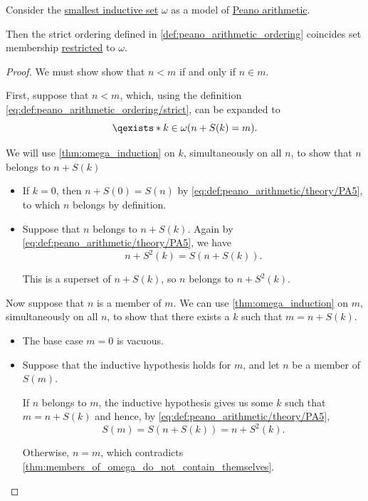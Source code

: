 \begin{proposition}\label{thm:omega_natural_numbers_order}
  Consider the \hyperref[def:smallest_inductive_set]{smallest inductive set} \( \omega \) as a model of \hyperref[def:peano_arithmetic]{Peano arithmetic}.

  Then the strict ordering defined in \cref{def:peano_arithmetic_ordering} coincides set membership \hyperref[def:relation/restriction]{restricted} to \( \omega \).
\end{proposition}
\begin{proof}
  We must show show that \( n < m \) if and only if \( n \in m \).

  \SufficiencySubProof First, suppose that \( n < m \), which, using the definition \eqref{eq:def:peano_arithmetic_ordering/strict}, can be expanded to
  \begin{equation}\label{eq:thm:omega_natural_numbers_order/proof/order_definition}
    \qexists* {k \in \omega} (n + S(k) = m).
  \end{equation}

  We will use \cref{thm:omega_induction} on \( k \), simultaneously on all \( n \), to show that \( n \) belongs to \( n + S(k) \)
  \begin{itemize}
    \item If \( k = 0 \), then \( n + S(0) = S(n) \) by \eqref{eq:def:peano_arithmetic/theory/PA5}, to which \( n \) belongs by definition.

    \item Suppose that \( n \) belongs to \( n + S(k) \). Again by \eqref{eq:def:peano_arithmetic/theory/PA5}, we have
    \begin{equation*}
      n + S^2(k) = S(n + S(k)).
    \end{equation*}

    This is a superset of \( n + S(k) \), so \( n \) belongs to \( n + S^2(k) \).
  \end{itemize}

  \NecessitySubProof Now suppose that \( n \) is a member of \( m \). We can use \cref{thm:omega_induction} on \( m \), simultaneously on all \( n \), to show that there exists a \( k \) such that \( m = n + S(k) \).

  \begin{itemize}
    \item The base case \( m = 0 \) is vacuous.
    \item Suppose that the inductive hypothesis holds for \( m \), and let \( n \) be a member of \( S(m) \).

    If \( n \) belongs to \( m \), the inductive hypothesis gives us some \( k \) such that \( m = n + S(k) \) and hence, by \eqref{eq:def:peano_arithmetic/theory/PA5},
    \begin{equation*}
      S(m) = S(n + S(k)) = n + S^2(k).
    \end{equation*}

    Otherwise, \( n = m \), which contradicts \cref{thm:members_of_omega_do_not_contain_themselves}.
  \end{itemize}
\end{proof}
